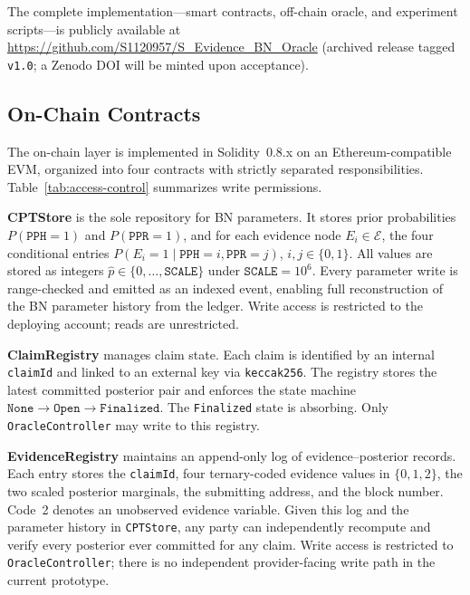 \documentclass[journal]{IEEEtran}
\theoremstyle{definition}
\theoremstyle{remark}
\begin{document}
The complete implementation---smart contracts,
off-chain oracle, and experiment scripts---is publicly
available at
\url{https://github.com/S1120957/S_Evidence_BN_Oracle}
(archived release tagged \texttt{v1.0}; a Zenodo DOI
will be minted upon acceptance).

\subsection{On-Chain Contracts}

The on-chain layer is implemented in Solidity~0.8.x
on an Ethereum-compatible EVM, organized into four
contracts with strictly separated responsibilities.
Table~\ref{tab:access-control} summarizes write
permissions.

\textbf{CPTStore} is the sole repository for BN
parameters. It stores prior probabilities
$P(\texttt{PPH}=1)$ and $P(\texttt{PPR}=1)$, and for
each evidence node $E_i\in\mathcal{E}$, the four
conditional entries
$P(E_i=1\mid\texttt{PPH}=i,\texttt{PPR}=j)$,
$i,j\in\{0,1\}$. All values are stored as integers
$\widehat{p}\in\{0,\dots,\texttt{SCALE}\}$ under
$\texttt{SCALE}=10^6$. Every parameter write is
range-checked and emitted as an indexed event,
enabling full reconstruction of the BN parameter
history from the ledger. Write access is restricted
to the deploying account; reads are unrestricted.

\textbf{ClaimRegistry} manages claim state. Each
claim is identified by an internal \texttt{claimId}
and linked to an external key via \texttt{keccak256}.
The registry stores the latest committed posterior
pair and enforces the state machine
$\texttt{None}\to\texttt{Open}\to\texttt{Finalized}$.
The \texttt{Finalized} state is absorbing. Only
\texttt{OracleController} may write to this registry.

\textbf{EvidenceRegistry} maintains an append-only
log of evidence--posterior records. Each entry stores the
\texttt{claimId}, four ternary-coded evidence values in
$\{0,1,2\}$, the two scaled posterior marginals, the
submitting address, and the block number. Code~2 denotes
an unobserved evidence variable. Given this log and the
parameter history in \texttt{CPTStore}, any party can
independently recompute and verify every posterior ever
committed for any claim. Write access is restricted
to \texttt{OracleController}; there is no independent
provider-facing write path in the current prototype.
\end{document}
